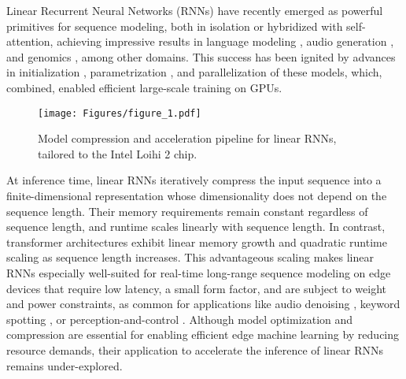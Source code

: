 Linear Recurrent Neural Networks (RNNs) have recently emerged as powerful primitives for sequence modeling, both in isolation or hybridized with self-attention, achieving impressive results in language modeling \cite{DBLP:conf/icml/PoliTNPDKSHER0M24}, audio generation \cite{DBLP:conf/icml/GoelGDR22}, and genomics \cite{DBLP:conf/nips/NguyenPFTWBMPRB23}, among other domains.
This success has been ignited by advances in initialization \cite{DBLP:conf/nips/GuDERR20}, parametrization \cite{DBLP:conf/iclr/GuGR22}, and parallelization \cite{DBLP:conf/nips/GuJGSDRR21,DBLP:journals/corr/abs-2312-00752,DBLP:conf/iclr/SmithWL23} of these models, which, combined, enabled efficient large-scale training on GPUs.

\begin{figure}[t]
    \centering
    \texttt{[image: Figures/figure\_1.pdf]}
    \caption{Model compression and acceleration pipeline for linear RNNs, tailored to the Intel Loihi 2 chip.}
    \label{figure_1}
\end{figure}

At inference time, linear RNNs iteratively compress the input sequence into a finite-dimensional representation whose dimensionality does not depend on the sequence length.
Their memory requirements remain constant regardless of sequence length, and runtime scales linearly with sequence length. In contrast, transformer architectures \cite{DBLP:conf/nips/VaswaniSPUJGKP17} exhibit linear memory growth and quadratic runtime scaling as sequence length increases.
This advantageous scaling makes linear RNNs especially well-suited for real-time long-range sequence modeling on edge devices that require low latency, a small form factor, and are subject to weight and power constraints, as common for applications like audio denoising \cite{Timcheck_2023}, keyword spotting \cite{DBLP:journals/corr/abs-1804-03209}, or perception-and-control \cite{DBLP:conf/nips/0001SGPF0B23}.
Although model optimization and compression are essential for enabling efficient edge machine learning by reducing resource demands, their application to accelerate the inference of linear RNNs remains under-explored.


